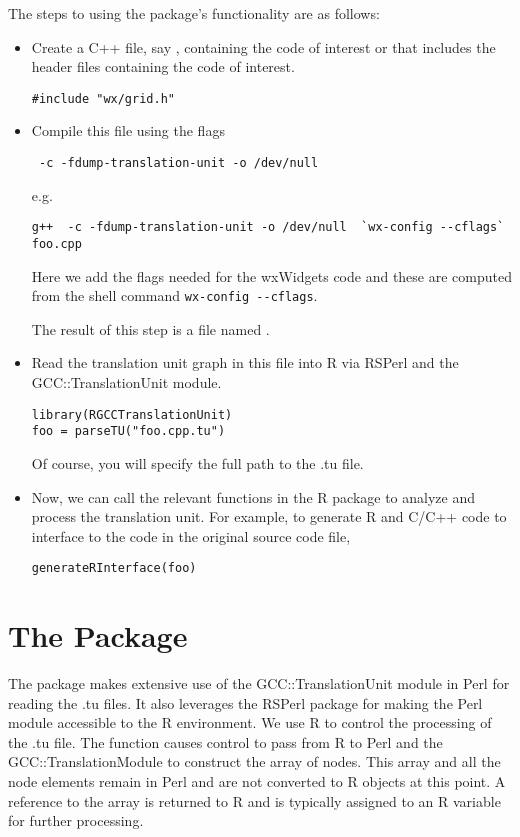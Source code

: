 \documentclass{article}
\begin{document}
The steps to using the package's functionality are
as follows:
\begin{itemize}
\item Create a C++ file, say ,  containing the code of interest or 
  that includes the header files containing the code of interest.
\begin{verbatim}
#include "wx/grid.h"
\end{verbatim}

\item Compile this file using the flags
\begin{verbatim}
 -c -fdump-translation-unit -o /dev/null 
\end{verbatim}
e.g.
\begin{verbatim}
g++  -c -fdump-translation-unit -o /dev/null  `wx-config --cflags` foo.cpp
\end{verbatim}
Here we add the flags needed for the wxWidgets code and these are
computed from the shell command \verb+wx-config --cflags+.

The result of this step is a file named .

\item Read the translation unit graph in this file into R via RSPerl
and the GCC::TranslationUnit module.
\begin{verbatim}
library(RGCCTranslationUnit)
foo = parseTU("foo.cpp.tu")
\end{verbatim}
Of course, you will specify the full path to the .tu file.

\item Now, we can call the relevant functions in
the R package to analyze and process the translation unit.
For example, to generate R and C/C++ code to interface
to the code in the original source code file, 
\begin{verbatim}
generateRInterface(foo)
\end{verbatim}

\end{itemize}



\section{The Package}

The package makes extensive use of the GCC::TranslationUnit module in
Perl for reading the .tu files.  It also leverages the RSPerl package
for making the Perl module accessible to the R environment.
We use R to control the processing of the .tu
file.  
The function 
causes control to pass from R to Perl and the GCC::TranslationModule
to construct the array of nodes.
This array and all the node elements remain in Perl
and are not converted to R objects at this point.
A reference to the array is returned to R and
is typically assigned to an R variable for further processing.
\end{document}
